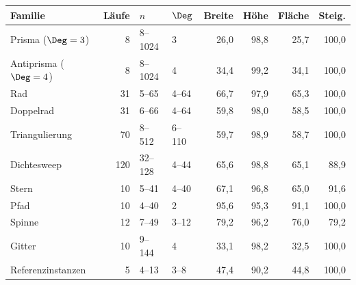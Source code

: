 \begin{tabular}{@{}lrllrrrr@{}}
\toprule
Familie & L\"aufe & $n$ & $\Deg$ & Breite & H\"ohe & Fl\"ache & Steig. \\
\midrule
Prisma ($\Deg=3$) & 8 & 8--1024 & 3 & 26{,}0 & 98{,}8 & 25{,}7 & 100{,}0 \\
Antiprisma ($\Deg=4$) & 8 & 8--1024 & 4 & 34{,}4 & 99{,}2 & 34{,}1 & 100{,}0 \\
Rad & 31 & 5--65 & 4--64 & 66{,}7 & 97{,}9 & 65{,}3 & 100{,}0 \\
Doppelrad & 31 & 6--66 & 4--64 & 59{,}8 & 98{,}0 & 58{,}5 & 100{,}0 \\
Triangulierung & 70 & 8--512 & 6--110 & 59{,}7 & 98{,}9 & 58{,}7 & 100{,}0 \\
Dichtesweep & 120 & 32--128 & 4--44 & 65{,}6 & 98{,}8 & 65{,}1 & 88{,}9 \\
Stern & 10 & 5--41 & 4--40 & 67{,}1 & 96{,}8 & 65{,}0 & 91{,}6 \\
Pfad & 10 & 4--40 & 2 & 95{,}6 & 95{,}3 & 91{,}1 & 100{,}0 \\
Spinne & 12 & 7--49 & 3--12 & 79{,}2 & 96{,}2 & 76{,}0 & 79{,}2 \\
Gitter & 10 & 9--144 & 4 & 33{,}1 & 98{,}2 & 32{,}5 & 100{,}0 \\
Referenzinstanzen & 5 & 4--13 & 3--8 & 47{,}4 & 90{,}2 & 44{,}8 & 100{,}0 \\
\bottomrule
\end{tabular}

